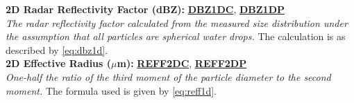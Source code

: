 \begin{hangparagraphs}
\textbf{2D Radar Reflectivity Factor (dBZ): }\textbf{\uline{DBZ1DC}},
\textbf{\uline{DBZ1DP}}\\
\emph{The radar reflectivity factor
calculated from the measured size distribution under the assumption
that all particles are spherical water drops. }The calculation is
as described by\emph{ }\eqref{eq:dbz1d}.\\

\textbf{2D Effective Radius ($\mu$m): }\textbf{\uline{REFF2DC}},
\textbf{\uline{REFF2DP}}\\
\emph{One-half the ratio of the third moment
of the particle diameter to the second moment. }The formula used is
given by \eqref{eq:reff1d}.\label{punch:5-6}\\
 
\end{hangparagraphs}


